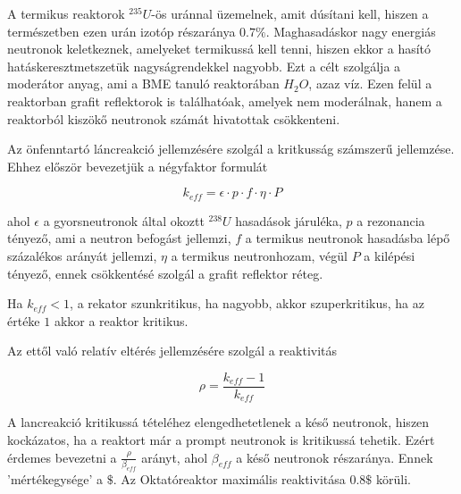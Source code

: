 \documentclass[a4paper,12pt]{article}
\begin{document}
\par A termikus reaktorok $^{235}U$-ös uránnal üzemelnek, amit dúsítani kell, hiszen a természetben ezen urán izotóp részaránya $0.7\%$. Maghasadáskor nagy energiás neutronok keletkeznek, amelyeket termikussá kell tenni, hiszen ekkor a hasító hatáskeresztmetszetük nagyságrendekkel nagyobb. Ezt a célt szolgálja a moderátor anyag, ami a BME tanuló reaktorában $H_{2}O$, azaz víz. Ezen felül a reaktorban grafit reflektorok is találhatóak, amelyek nem moderálnak, hanem a reaktorból kiszökő neutronok számát hivatottak csökkenteni.

\vspace{1cm}

\par Az önfenntartó láncreakció jellemzésére szolgál a kritkusság számszerű jellemzése. Ehhez először bevezetjük a négyfaktor formulát

\begin{equation*}
	k_{eff} = \epsilon \cdot p \cdot f \cdot \eta \cdot P
\end{equation*}

\par ahol $\epsilon$ a gyorsneutronok által okoztt $^{238}U$ hasadások járuléka, $p$ a rezonancia tényező, ami a neutron befogást jellemzi, $f$ a termikus neutronok hasadásba lépő százalékos arányát jellemzi, $\eta$ a termikus neutronhozam, végül $P$ a kilépési tényező, ennek csökkentésé szolgál a grafit reflektor réteg.

\par Ha $k_{eff} < 1$, a rekator szunkritikus, ha nagyobb, akkor szuperkritikus, ha az értéke $1$ akkor a reaktor kritikus.

\par Az ettől való relatív eltérés jellemzésére szolgál a reaktivitás

\begin{equation*}
	\rho = \frac{k_{eff} - 1}{k_{eff}}
\end{equation*}

\par A lancreakció kritikussá tételéhez elengedhetetlenek a késő neutronok, hiszen kockázatos, ha a reaktort már a prompt neutronok is kritikussá tehetik. Ezért érdemes bevezetni a $\frac{\rho}{\beta_{eff}}$ arányt, ahol $\beta_{eff}$ a késő neutronok részaránya. Ennek 'mértékegysége' a $\$$. Az Oktatóreaktor maximális reaktivitása $0.8\$$ körüli.

\vspace{1cm}
\end{document}
